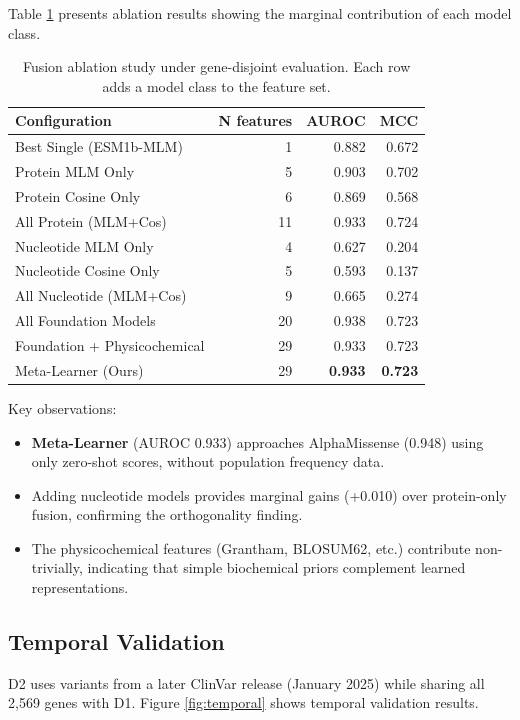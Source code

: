 \documentclass{article}
\begin{document}
Table \ref{tab:ablation} presents ablation results showing the marginal contribution of each model class.

\begin{table}[h]
\centering
\caption{Fusion ablation study under gene-disjoint evaluation. Each row adds a model class to the feature set.}
\label{tab:ablation}
\small
\begin{tabular}{lrrr}
\toprule
\textbf{Configuration} & \textbf{N features} & \textbf{AUROC} & \textbf{MCC} \\
\midrule
Best Single (ESM1b-MLM) & 1 & 0.882 & 0.672 \\
Protein MLM Only & 5 & 0.903 & 0.702 \\
Protein Cosine Only & 6 & 0.869 & 0.568 \\
All Protein (MLM+Cos) & 11 & 0.933 & 0.724 \\
Nucleotide MLM Only & 4 & 0.627 & 0.204 \\
Nucleotide Cosine Only & 5 & 0.593 & 0.137 \\
All Nucleotide (MLM+Cos) & 9 & 0.665 & 0.274 \\
\midrule
All Foundation Models & 20 & 0.938 & 0.723 \\
Foundation + Physicochemical & 29 & 0.933 & 0.723 \\
\midrule
Meta-Learner (Ours) & 29 & \textbf{0.933} & \textbf{0.723} \\
\bottomrule
\end{tabular}
\end{table}

Key observations:
\begin{itemize}
    \item \textbf{Meta-Learner} (AUROC 0.933) approaches AlphaMissense (0.948) using only zero-shot scores, without population frequency data.
    \item Adding nucleotide models provides marginal gains (+0.010) over protein-only fusion, confirming the orthogonality finding.
    \item The physicochemical features (Grantham, BLOSUM62, etc.) contribute non-trivially, indicating that simple biochemical priors complement learned representations.
\end{itemize}

\subsection{Temporal Validation}

D2 uses variants from a later ClinVar release (January 2025) while sharing all 2,569 genes with D1. Figure \ref{fig:temporal} shows temporal validation results.
\end{document}

